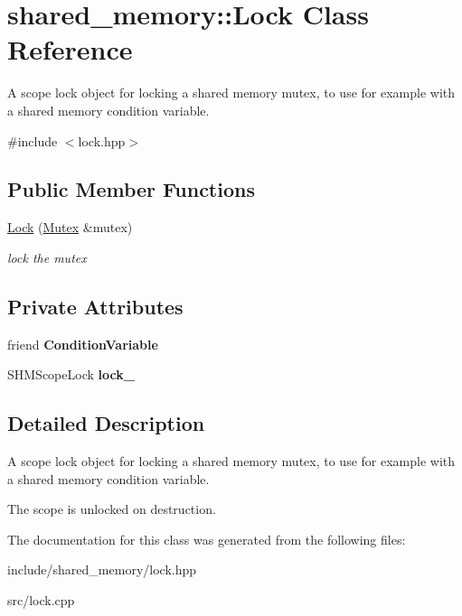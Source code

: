 \hypertarget{classshared__memory_1_1Lock}{}\section{shared\+\_\+memory\+:\+:Lock Class Reference}
\label{classshared__memory_1_1Lock}


A scope lock object for locking a shared memory mutex, to use for example with a shared memory condition variable.  




{\ttfamily \#include $<$lock.\+hpp$>$}

\subsection*{Public Member Functions}
\begin{DoxyCompactItemize}
\item 
\mbox{\label{classshared__memory_1_1Lock_aacd7b7ee828e6a83bf18497ea7e33d70}} 
\hyperlink{classshared__memory_1_1Lock_aacd7b7ee828e6a83bf18497ea7e33d70}{Lock} (\hyperlink{classshared__memory_1_1Mutex}{Mutex} \&mutex)
\begin{DoxyCompactList}\small\item\em lock the mutex \end{DoxyCompactList}\end{DoxyCompactItemize}
\subsection*{Private Attributes}
\begin{DoxyCompactItemize}
\item 
\mbox{\label{classshared__memory_1_1Lock_ab376f06fa4c31a6b2352f307f2bfe007}} 
friend {\bfseries Condition\+Variable}
\item 
\mbox{\label{classshared__memory_1_1Lock_aa97f73af624861f63cb827b8f8a082f2}} 
S\+H\+M\+Scope\+Lock {\bfseries lock\+\_\+}
\end{DoxyCompactItemize}


\subsection{Detailed Description}
A scope lock object for locking a shared memory mutex, to use for example with a shared memory condition variable. 

The scope is unlocked on destruction. 

The documentation for this class was generated from the following files\+:\begin{DoxyCompactItemize}
\item 
include/shared\+\_\+memory/lock.\+hpp\item 
src/lock.\+cpp\end{DoxyCompactItemize}
